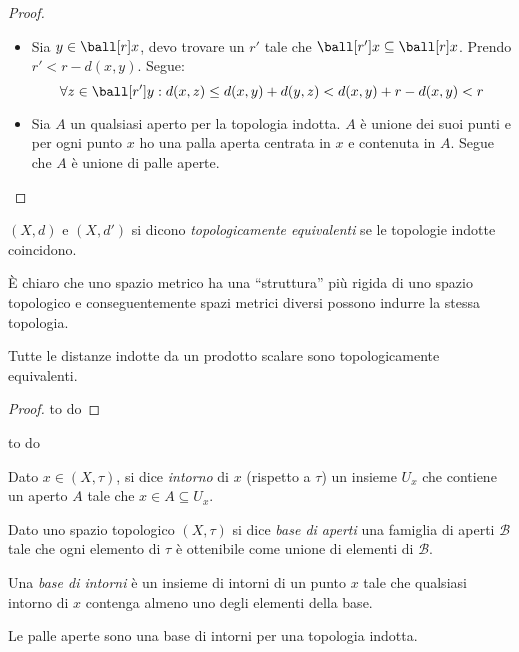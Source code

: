 \begin{proof}\noindent
\begin{itemize}
\item Sia $y \in \ball[r]x$, devo trovare un $r'$ tale che $\ball[r']x \subseteq \ball[r]x$. Prendo $r' < r-d(x,y)$. Segue:
\[\forall z \in \ball[r']y: d(x,z) \le d(x,y) + d(y,z) < d(x,y)  + r - d(x,y) < r\]
\item Sia $A$ un qualsiasi aperto per la topologia indotta. $A$ è unione dei suoi punti e per ogni punto $x$ ho una palla aperta centrata in $x$ e contenuta in $A$. Segue che $A$ è unione di palle aperte.
\end{itemize}
\end{proof}

\begin{defn}
$(X,d)$ e $(X,d')$ si dicono \emph{topologicamente equivalenti} se le topologie indotte coincidono.
\end{defn}

\begin{oss}
È chiaro che uno spazio metrico ha una ``struttura'' più rigida di uno spazio topologico e conseguentemente spazi metrici diversi possono indurre la stessa topologia.
\end{oss}

\begin{teo}
Tutte le distanze indotte da un prodotto scalare sono topologicamente equivalenti.
\end{teo}

\begin{proof} 
to do
\end{proof}

\begin{es}
to do
\end{es}

\begin{defn}[Intorno]
Dato $x \in (X,\tau)$, si dice \emph{intorno} di $x$ (rispetto a $\tau$) un insieme $U_x$ che contiene un aperto $A$ tale che $x \in A \subseteq U_x$.
\end{defn}

\begin{defn}
Dato uno spazio topologico $(X,\tau)$ si dice \emph{base di aperti} una famiglia di aperti $\mathcal B$ tale che ogni elemento di $\tau$ è ottenibile come unione di elementi di $\mathcal B$.
\end{defn}

\begin{defn}
Una \emph{base di intorni} è un insieme di intorni di un punto $x$ tale che qualsiasi intorno di $x$ contenga almeno uno degli elementi della base.
\end{defn}

\begin{oss}
Le palle aperte sono una base di intorni per una topologia indotta.
\end{oss}